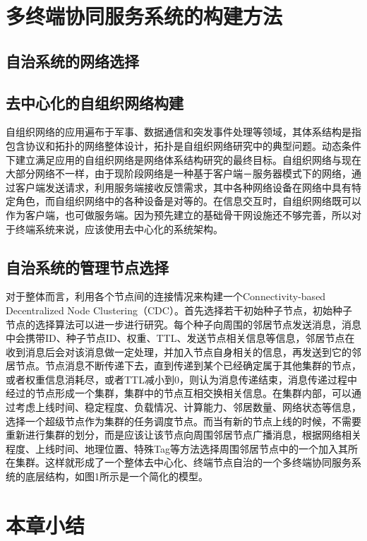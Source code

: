 \section{多终端协同服务系统的构建方法}\label{sec:service_system_decentralized_network}
\subsection{自治系统的网络选择}

\subsection{去中心化的自组织网络构建}
自组织网络的应用遍布于军事、数据通信和突发事件处理等领域，其体系结构是指包含协议和拓扑的网络整体设计，拓扑是自组织网络研究中的典型问题。动态条件下建立满足应用的自组织网络是网络体系结构研究的最终目标。自组织网络与现在大部分网络不一样，由于现阶段网络是一种基于客户端－服务器模式下的网络，通过客户端发送请求，利用服务端接收反馈需求，其中各种网络设备在网络中具有特定角色，而自组织网络中的各种设备是对等的。在信息交互时，自组织网络既可以作为客户端，也可做服务端。因为预先建立的基础骨干网设施还不够完善，所以对于终端系统来说，应该使用去中心化的系统架构。

\subsection{自治系统的管理节点选择}
对于整体而言，利用各个节点间的连接情况来构建一个Connectivity-based Decentralized Node Clustering（CDC）。首先选择若干初始种子节点，初始种子节点的选择算法可以进一步进行研究。每个种子向周围的邻居节点发送消息，消息中会携带ID、种子节点ID、权重、TTL、发送节点相关信息等信息，邻居节点在收到消息后会对该消息做一定处理，并加入节点自身相关的信息，再发送到它的邻居节点。节点消息不断传递下去，直到传递到某个已经确定属于其他集群的节点，或者权重信息消耗尽，或者TTL减小到0，则认为消息传递结束，消息传递过程中经过的节点形成一个集群，集群中的节点互相交换相关信息。在集群内部，可以通过考虑上线时间、稳定程度、负载情况、计算能力、邻居数量、网络状态等信息，选择一个超级节点作为集群的任务调度节点。而当有新的节点上线的时候，不需要重新进行集群的划分，而是应该让该节点向周围邻居节点广播消息，根据网络相关程度、上线时间、地理位置、特殊Tag等方法选择周围邻居节点中的一个加入其所在集群。这样就形成了一个整体去中心化、终端节点自治的一个多终端协同服务系统的底层结构，如图1所示是一个简化的模型。

\section{本章小结}\label{sec:service_system_summary}